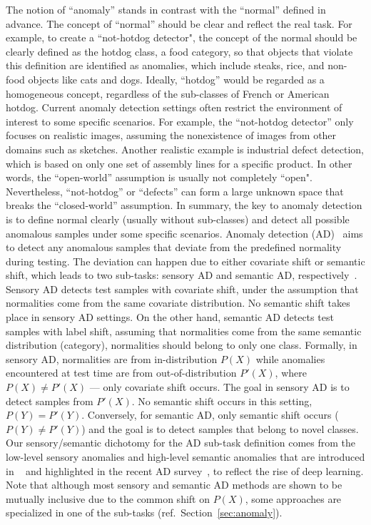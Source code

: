 \label{sec:tax_anomaly}
The notion of ``anomaly'' stands in contrast with the ``normal'' defined in advance.
The concept of ``normal'' should be clear and reflect the real task.
For example, to create a ``not-hotdog detector", the concept of the normal should be clearly defined as the hotdog class, \ie a food category, so that objects that violate this definition are identified as anomalies, which include steaks, rice, and non-food objects like cats and dogs.
Ideally, ``hotdog'' would be regarded as a homogeneous concept, regardless of the sub-classes of French or American hotdog.
Current anomaly detection settings often restrict the environment of interest to some specific scenarios.
For example, the ``not-hotdog detector'' only focuses on realistic images,
assuming the nonexistence of images from other domains such as sketches.
Another realistic example is industrial defect detection, which is based on only one set of assembly lines for a specific product.
In other words, the ``open-world'' assumption is usually not completely ``open".
Nevertheless, ``not-hotdog'' or ``defects'' can form a large unknown space that breaks the ``closed-world'' assumption.
In summary, the key to anomaly detection is to define normal clearly (usually without sub-classes) and detect all possible anomalous samples under some specific scenarios.
\smallskip
{}
Anomaly detection (AD)~ aims to detect any anomalous samples that deviate from the predefined normality during testing. The deviation can happen due to either covariate shift or semantic shift, which leads to two sub-tasks: sensory AD and semantic AD, respectively~.
Sensory AD detects test samples with covariate shift, under the assumption that normalities come from the same covariate distribution. No semantic shift takes place in sensory AD settings.
On the other hand, semantic AD detects test samples with label shift, assuming that normalities come from the same semantic distribution (category), \ie normalities should belong to only one class.
Formally, in sensory AD, normalities are from in-distribution $P(X)$ while anomalies encountered at test time are from out-of-distribution $P'(X)$, where $P(X) \neq P'(X)$ --- only covariate shift occurs.
The goal in sensory AD is to detect samples from $P'(X)$.
No semantic shift occurs in this setting, \ie $P(Y)=P'(Y)$. Conversely, for semantic AD, only semantic shift occurs (\ie $P(Y) \neq P'(Y)$) and the goal is to detect samples that belong to novel classes.
\smallskip
{}
Our sensory/semantic dichotomy for the AD sub-task definition comes from the low-level sensory anomalies and high-level semantic anomalies that are introduced in ~ and highlighted in the recent AD survey~, to reflect the rise of deep learning. Note that although most sensory and semantic AD methods are shown to be mutually inclusive due to the common shift on $P(X)$, some approaches are specialized in one of the sub-tasks (ref.~Section~\ref{sec:anomaly}).
